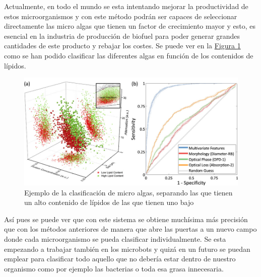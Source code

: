 \documentclass[a4paper, 12pt, UTF8]{article}
\begin{document}
Actualmente, en todo el mundo se esta intentando mejorar la productividad de estos microorganismos y con este método podrán ser capaces de seleccionar directamente las micro algas que tienen un factor de crecimiento mayor y esto, es esencial en la industria de producción de biofuel para poder generar grandes cantidades de este producto y rebajar los costes. Se puede ver en la \hyperref[fig:impacto_2]{Figura \ref{fig:impacto_2}} como se han podido clasificar las diferentes algas en función de los contenidos de lípidos.

\begin{figure}[H]
	\centering
	\includegraphics[width=\linewidth]{impacto_2}
	\caption{Ejemplo de la clasificación de micro algas, separando las que tienen un alto contenido de lípidos de las que tienen uno bajo}
	\label{fig:impacto_2}
\end{figure}

Así pues se puede ver que con este sistema se obtiene muchísima más precisión que con los métodos anteriores de manera que abre las puertas a un nuevo campo donde cada microorganismo se pueda clasificar individualmente. Se esta empezando a trabajar también en los microbots \cite{microbots} y quizá en un futuro se puedan emplear para clasificar todo aquello que no debería estar dentro de nuestro organismo como por ejemplo las bacterias o toda esa grasa innecesaria. 

\printbibliography
\end{document}

